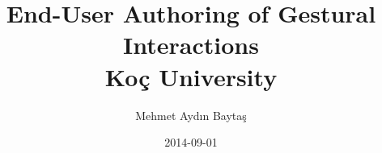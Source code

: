 \documentclass[10pt,twoside]{book}
\begin{document}
\title{
	{End-User Authoring of Gestural Interactions}\\
	{\large Koç University}
}
\author{Mehmet Aydın Baytaş}
\date{2014-09-01}

\maketitle

%
%
%
%
%
%
%
%
%
%
%
%
\end{document}
